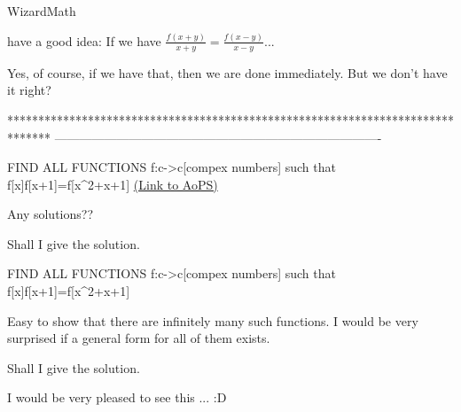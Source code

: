 


\begin{solution}
	\begin{tcolorbox}\begin{bolded}WizardMath\end{bolded} have a good idea: If we have $\frac{f(x+y)}{x+y} = \frac{f(x-y)}{x-y}$...\end{tcolorbox}
Yes, of course, if we have that, then we are done immediately. But we don't have it right?


\end{solution}
*******************************************************************************
-------------------------------------------------------------------------------

\begin{problem}
	FIND ALL FUNCTIONS f:c->c[compex numbers] such that
f[x]f[x+1]=f[x^2+x+1]
	\flushright \href{https://artofproblemsolving.com/community/c6h1570579}{(Link to AoPS)}
\end{problem}



\begin{solution}
	Any solutions??
\end{solution}



\begin{solution}
	Shall I give the solution.
\end{solution}



\begin{solution}
	\begin{tcolorbox}FIND ALL FUNCTIONS f:c->c[compex numbers] such that
f[x]f[x+1]=f[x^2+x+1]\end{tcolorbox}
Easy to show that there are infinitely many such functions.
I would be very surprised if a general form for all of them exists.

\begin{tcolorbox}Shall I give the solution.\end{tcolorbox}
I would be very pleased to see this ...  :D 


\end{solution}



